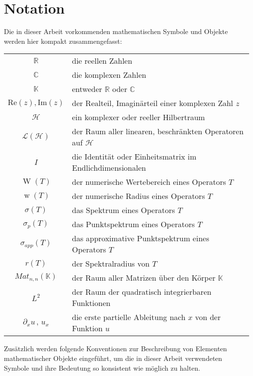 \section*{Notation}
Die in dieser Arbeit vorkommenden mathematischen Symbole und Objekte werden hier kompakt zusammengefasst:

\begin{center}
    \renewcommand{\arraystretch}{1.5}
    \begin{tabular}{ c l }
        
        $\mathbb{R}$ & die reellen Zahlen \\
        $\mathbb{C}$ & die komplexen Zahlen \\
        $\mathbb{K}$ & entweder $\mathbb{R}$ oder $\mathbb{C}$ \\
        $\mathrm{Re}(z), \mathrm{Im}(z)$ & der Realteil, Imaginärteil einer komplexen Zahl $z$ \\ 
        $\mathcal{H}$ & ein komplexer oder reeller Hilbertraum \\
        $\mathcal{L(H)}$ & der Raum aller linearen, beschränkten Operatoren auf $\mathcal{H}$ \\
        $I$ & die Identität oder Einheitsmatrix im Endlichdimensionalen\\
        $\operatorname{W}(T)$ & der numerische Wertebereich eines Operators $T$ \\
        $\operatorname{w}(T)$ & der numerische Radius eines Operators $T$ \\
        $\sigma(T)$ & das Spektrum eines Operators $T$ \\
        $\sigma_p(T)$ & das Punktspektrum eines Operators $T$ \\
        $\sigma_{app}(T)$ & das approximative Punktspektrum eines Operators $T$ \\
        $r(T)$ & der Spektralradius von $T$ \\
        $\mathit{Mat}_{n,n}(\mathbb{K})$ & der Raum aller Matrizen über den Körper $\mathbb{K}$ \\
        $L^2$ & der Raum der quadratisch integrierbaren Funktionen\\
        $\partial_x u \,,\, u_x$ & die erste partielle Ableitung nach $x$ von der Funktion $u$
    \end{tabular}
\end{center}

Zusätzlich werden folgende Konventionen zur Beschreibung von Elementen mathematischer Objekte eingeführt, um die in dieser Arbeit verwendeten Symbole und ihre Bedeutung so konsistent wie möglich zu halten.

